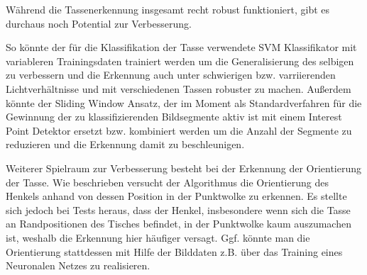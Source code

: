 Während die Tassenerkennung insgesamt recht robust funktioniert, gibt es durchaus noch Potential zur Verbesserung.

So könnte der für die Klassifikation der Tasse verwendete SVM Klassifikator mit variableren Trainingsdaten trainiert werden um die Generalisierung des selbigen zu verbessern und die Erkennung auch unter schwierigen bzw. varriierenden Lichtverhältnisse und mit verschiedenen Tassen robuster zu machen. Außerdem könnte der Sliding Window Ansatz, der im Moment als Standardverfahren für die Gewinnung der zu klassifizierenden Bildsegmente aktiv ist mit einem Interest Point Detektor ersetzt bzw. kombiniert werden um die Anzahl der Segmente zu reduzieren und die Erkennung damit zu beschleunigen.

Weiterer Spielraum zur Verbesserung besteht bei der Erkennung der Orientierung der Tasse. Wie beschrieben versucht der Algorithmus die Orientierung des Henkels anhand von dessen Position in der Punktwolke zu erkennen. Es stellte sich jedoch bei Tests heraus, dass der Henkel, insbesondere wenn sich die Tasse an Randpositionen des Tisches befindet, in der Punktwolke kaum auszumachen ist, weshalb die Erkennung hier häufiger versagt. Ggf. könnte man die Orientierung stattdessen mit Hilfe der Bilddaten z.B. über das Training eines Neuronalen Netzes zu realisieren.